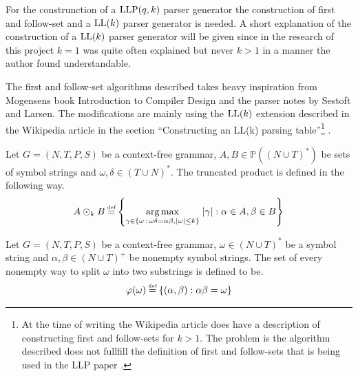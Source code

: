 For the construnction of a $\text{LLP}(q,k)$ parser generator the construction of first and follow-set \cite[5]{Vagner2007} and a $\text{LL}(k)$ parser generator is needed. A short explanation of the construction of a $\text{LL}(k)$ parser generator will be given since in the research of this project $k = 1$ was quite often explained but never $k > 1$ in a manner the author found understandable.

The first and follow-set algorithms described takes heavy inspiration from Mogensens book Introduction to Compiler Design \cite[55-65]{Mogensen} and the parser notes \cite[10-15]{notes:parser} by Sestoft and Larsen. The modifications are mainly using the $\text{LL}(k)$ extension described in the Wikipedia article in the section ``Constructing an LL(k) parsing table''\footnote{At the time of writing the Wikipedia article does have a description of constructing first and follow-sets for $k > 1$. The problem is the algorithm described does not fullfill the definition of first and follow-sets that is being used in the LLP paper \cite[5]{Vagner2007}.} \cite{wiki:LL_parser}.

\begin{definition}
    Let $G = (N, T, P, S)$ be a context-free grammar, $A, B \in \mathbb{P}((N \cup T)^*)$ be sets of symbol strings and $\omega, \delta \in (T \cup N)^*$. The truncated product is defined in the following way.
    \begin{gather*}
        A \odot_k B \defeq \left\{\underset{\gamma \in \{\omega \, : \, \omega\delta = \alpha\beta, |\omega| \leq k\}}{\arg \max} \; |\gamma| : \alpha \in A, \beta \in B\right\}
    \end{gather*}
\end{definition}

\begin{definition}
    Let $G = (N, T, P, S)$ be a context-free grammar, $\omega \in (N \cup T)^*$ be a symbol string and $\alpha, \beta \in (N \cup T)^+$ be nonempty symbol strings. The set of every nonempty way to split $\omega$ into two substrings is defined to be.
    \begin{gather*}
        \varphi(\omega) \defeq \{(\alpha, \beta) : \alpha\beta = \omega\}
    \end{gather*}
\end{definition}

